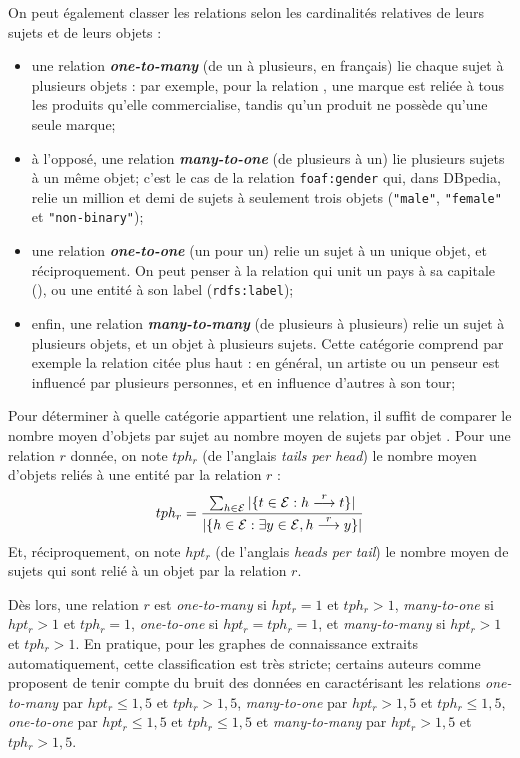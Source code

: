 On peut également classer les relations selon les cardinalités relatives de leurs sujets et de leurs objets :
\begin{itemize}
    \item une relation \textbf{\textit{one-to-many}} (de un à plusieurs, en français) lie chaque sujet à plusieurs objets : par exemple, pour la relation , 
    une marque est reliée à tous les produits qu'elle commercialise, tandis qu'un produit ne possède qu'une seule marque;
    \item à l'opposé, une relation \textbf{\textit{many-to-one}} (de plusieurs à un) lie plusieurs sujets à un même objet; c'est le cas de la relation \texttt{foaf:gender} qui, dans DBpedia, relie un million et demi de sujets à seulement trois objets (\texttt{"male"}, \texttt{"female"} et \texttt{"non-binary"});
    \item une relation \textbf{\textit{one-to-one}} (un pour un) relie un sujet à un unique objet, et réciproquement. On peut penser à la relation qui unit un pays à sa capitale (), ou une entité à son label (\texttt{rdfs:label});
    \item enfin, une relation \textbf{\textit{many-to-many}} (de plusieurs à plusieurs) relie un sujet à plusieurs objets, et un objet à plusieurs sujets. Cette catégorie comprend par exemple la relation  citée plus haut : en général, un artiste ou un penseur est influencé par plusieurs personnes, et en influence d'autres à son tour;
\end{itemize}

Pour déterminer à quelle catégorie appartient une relation, il suffit de comparer le nombre moyen d'objets par sujet au nombre moyen de sujets par objet \cite{transh}. Pour une relation $r$ donnée, on note $tph_r$ (de l'anglais \textit{tails per head}) le nombre moyen d'objets reliés à une entité par la relation $r$ :
\begin{equation}
    tph_r = \frac{\sum_{h \in \mathcal{E}} |\{ t \in \mathcal{E} : h \overset{r}{\longrightarrow} t \}|}{|\{ h \in \mathcal{E} : \exists y \in \mathcal{E}, h \overset{r}{\longrightarrow} y \}| }
\end{equation}
Et, réciproquement, on note $hpt_r$ (de l'anglais \textit{heads per tail}) le nombre moyen de sujets qui sont relié à un objet par la relation $r$. 

Dès lors, une relation $r$ est \textit{one-to-many} si $hpt_r = 1$ et $tph_r > 1$, \textit{many-to-one} si $hpt_r > 1$ et $tph_r = 1$, \textit{one-to-one} si $hpt_r = tph_r = 1$, et \textit{many-to-many} si $hpt_r > 1$ et $tph_r > 1$. En pratique, pour les graphes de connaissance extraits automatiquement, cette classification est très stricte; certains auteurs comme \cite{bordes2013translating, transh} proposent de tenir compte du bruit des données en caractérisant les relations \textit{one-to-many} par $hpt_r \leq 1,5$ et $tph_r > 1,5$, \textit{many-to-one} par $hpt_r > 1,5$ et $tph_r \leq 1,5$, \textit{one-to-one} par $hpt_r \leq 1,5$ et $tph_r \leq  1,5$ et \textit{many-to-many} par $hpt_r > 1,5$ et $tph_r > 1,5$.

